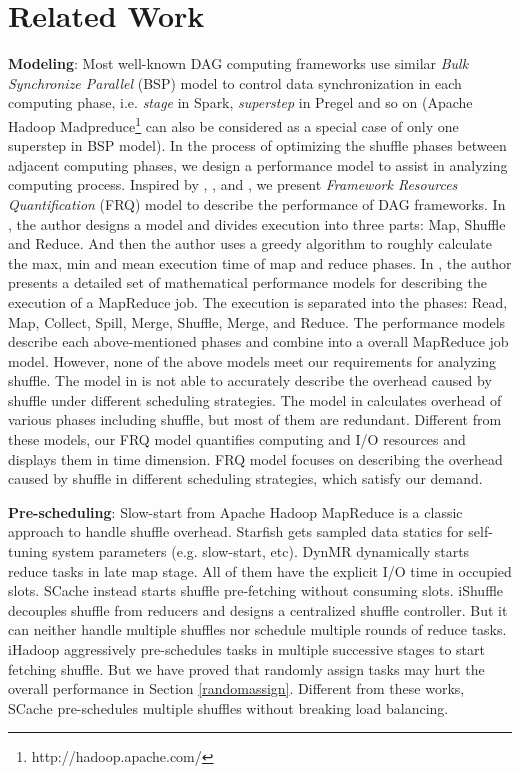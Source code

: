 \section{Related Work}

{\color{blue}
\textbf{Modeling}: Most well-known DAG computing frameworks use similar \textit{Bulk Synchronize Parallel} (BSP)\cite{valiant1990bridging} model to control data synchronization in each computing phase, i.e. \textit{stage} in Spark, \textit{superstep} in Pregel\cite{malewicz2010pregel} and so on (Apache Hadoop Madpreduce\footnote{http://hadoop.apache.com/} can also be considered as a special case of only one superstep in BSP model). 
In the process of optimizing the shuffle phases between adjacent computing phases, we design a performance model to assist in analyzing computing process.
Inspired by \cite{verma2011aria}, \cite{herodotou2011hadoop}, and \cite{polo2010performance}, we present \textit{Framework Resources Quantification} (FRQ) model to describe the performance of DAG frameworks.
In \cite{verma2011aria}, the author designs a model and divides execution into three parts: Map, Shuffle and Reduce. And then the author uses a greedy algorithm to roughly calculate the max, min and mean execution time of map and reduce phases.
In \cite{herodotou2011hadoop}, the author presents a detailed set of mathematical performance models for describing the execution of a MapReduce job. The execution is separated into the phases: Read, Map, Collect, Spill, Merge, Shuffle, Merge, and Reduce. The performance models describe each above-mentioned phases and combine into a overall MapReduce job model. 
However, none of the above models meet our requirements for analyzing shuffle.
The model in \cite{verma2011aria} is not able to accurately describe the overhead caused by shuffle under different scheduling strategies. The model in \cite{herodotou2011hadoop} calculates overhead of various phases including shuffle, but most of them are redundant. 
Different from these models, our FRQ model quantifies computing and I/O resources and displays them in time dimension. FRQ model focuses on describing the overhead caused by shuffle in different scheduling strategies, which satisfy our demand.
}

\textbf{Pre-scheduling}: Slow-start from Apache Hadoop MapReduce is a classic approach to handle shuffle overhead. 
Starfish \cite{starfish} gets sampled data statics for self-tuning system parameters (e.g. slow-start, etc). 
DynMR \cite{dynmr} dynamically starts reduce tasks in late map stage. 
All of them have the explicit I/O time in occupied slots. 
SCache instead starts shuffle pre-fetching without consuming slots. 
iShuffle \cite{ishuffle} decouples shuffle from reducers and designs a centralized shuffle controller. 
But it can neither handle multiple shuffles nor schedule multiple rounds of reduce tasks. 
iHadoop \cite{ihadoop} aggressively pre-schedules tasks in multiple successive stages to start fetching shuffle. 
But we have proved that randomly assign tasks may hurt the overall performance in Section \ref{randomassign}. 
Different from these works, SCache pre-schedules multiple shuffles without breaking load balancing. 

